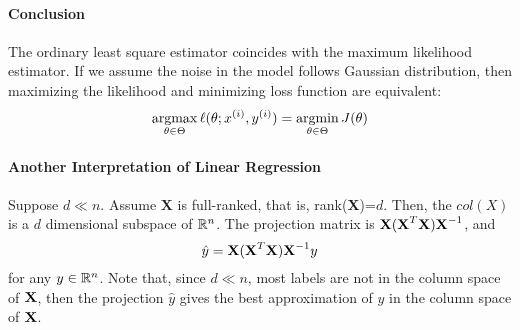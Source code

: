 \documentclass{report}
\newcommand{\upi}[0]{^{(i)}}
\begin{document}
        \paragraph{Conclusion} The ordinary least square estimator coincides with the maximum likelihood estimator. If we assume the noise in the model follows Gaussian distribution, then maximizing the likelihood and minimizing loss function are equivalent:
        \begin{align}
            \argmax_{\theta \in \Theta} \ell(\theta; x\upi, y\upi) = \argmin_{\theta \in \Theta} J(\theta)
        \end{align}
        
        \paragraph{Another Interpretation of Linear Regression} Suppose $d \ll n$. Assume $\textbf{X}$ is full-ranked, that is, rank(\textbf{X})=$d$. Then, the $col(X)$ is a $d$ dimensional subspace of $\mathbb{R}^n$. The projection matrix is $\textbf{X} (\textbf{X}^T \textbf{X})\textbf{X}^{-1}$, and 
        \begin{equation}
        	\hat{y} = \textbf{X} (\textbf{X}^T \textbf{X})\textbf{X}^{-1} y
        \end{equation}
        for any $y \in \mathbb{R}^n$. Note that, since $d \ll n$, most labels are not in the column space of $\textbf{X}$, then the projection $\hat{y}$ gives the best approximation of $y$ in the column space of $\textbf{X}$.
\end{document}
